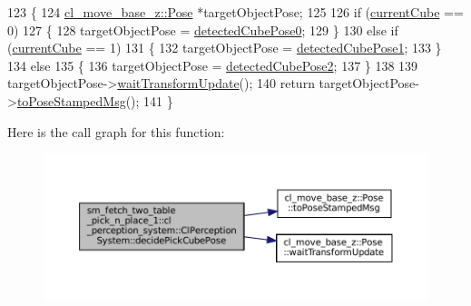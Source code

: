 \begin{DoxyCode}
123     \{
124         \hyperlink{classcl__move__base__z_1_1Pose}{cl\_move\_base\_z::Pose} *targetObjectPose;
125 
126         \textcolor{keywordflow}{if} (\hyperlink{classsm__fetch__two__table__pick__n__place__1_1_1cl__perception__system_1_1ClPerceptionSystem_a0acc9100f7de93d128c356fe928f311a}{currentCube} == 0)
127         \{
128             targetObjectPose = \hyperlink{classsm__fetch__two__table__pick__n__place__1_1_1cl__perception__system_1_1ClPerceptionSystem_ab60765c4ba512b25c49c508464c49adb}{detectedCubePose0};
129         \}
130         \textcolor{keywordflow}{else} \textcolor{keywordflow}{if} (\hyperlink{classsm__fetch__two__table__pick__n__place__1_1_1cl__perception__system_1_1ClPerceptionSystem_a0acc9100f7de93d128c356fe928f311a}{currentCube} == 1)
131         \{
132             targetObjectPose = \hyperlink{classsm__fetch__two__table__pick__n__place__1_1_1cl__perception__system_1_1ClPerceptionSystem_adf8bf74ca5091581bf23335b8573073d}{detectedCubePose1};
133         \}
134         \textcolor{keywordflow}{else}
135         \{
136             targetObjectPose = \hyperlink{classsm__fetch__two__table__pick__n__place__1_1_1cl__perception__system_1_1ClPerceptionSystem_ab4594ab1597649673845c90002c8a8e7}{detectedCubePose2};
137         \}
138 
139         targetObjectPose->\hyperlink{classcl__move__base__z_1_1Pose_a5f8576c3dacfb2f2e7f9df5105c480ea}{waitTransformUpdate}();
140         \textcolor{keywordflow}{return} targetObjectPose->\hyperlink{classcl__move__base__z_1_1Pose_a63887a88c1ac6e9a4a71b8d7d11aed6c}{toPoseStampedMsg}();
141     \}
\end{DoxyCode}
Here is the call graph for this function\+:
\nopagebreak
\begin{figure}[H]
\begin{center}
\leavevmode
\includegraphics[width=350pt]{classsm__fetch__two__table__pick__n__place__1_1_1cl__perception__system_1_1ClPerceptionSystem_af9c32989b53ea6ac1da431134c8d2e39_cgraph}
\end{center}
\end{figure}
